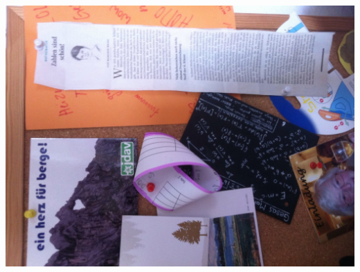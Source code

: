 \documentclass{uebblatt}
\begin{document}
\vfill
\centering
\includegraphics[scale=0.15]{images/moebiuspunkt}
\par
\end{document}
